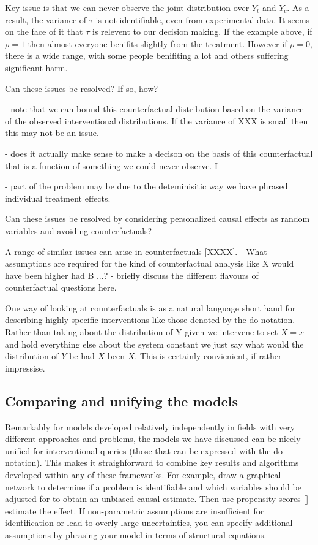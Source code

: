 \documentclass[11pt,a4paper,oneside]{book}
\begin{document}
Key issue is that we can never observe the joint distribution over $Y_t$ and $Y_c$. As a result, the variance of $\tau$ is not identifiable, even from experimental data. It seems on the face of it that $\tau$ is relevent to our decision making. If the example above, if $\rho = 1$ then almost everyone benifits slightly from the treatment. However if $\rho=0$, there is a wide range, with some people benifiting a lot and others suffering significant harm.  

Can these issues be resolved? If so, how? 

- note that we can bound this counterfactual distribution based on the variance of the observed interventional distributions. If the variance of XXX is small then this may not be an issue. 

- does it actually make sense to make a decison on the basis of this counterfactual that is a function of something we could never observe. I

- part of the problem may be due to the deteminisitic way we have phrased individual treatment effects. 

Can these issues be resolved by considering personalized causal effects as random variables and avoiding counterfactuals?

A range of similar issues can arise in counterfactuals \ref{XXXX}. 
- What assumptions are required for the kind of counterfactual analysis like X would have been higher had B ...?
- briefly discuss the different flavours of counterfactual questions here. 

One way of looking at counterfactuals is as a natural language short hand for describing highly specific interventions like those denoted by the do-notation. Rather than taking about the distribution of Y given we intervene to set $X=x$ and hold everything else about the system constant we just say what would the distribution of $Y$ be had $X$ been $X$. This is certainly convienient, if rather impressise. 


\subsection*{Comparing and unifying the models}

Remarkably for models developed relatively independently in fields with very different approaches and problems, the models we have discussed can be nicely unified for interventional queries (those that can be expressed with the do-notation). This makes it straighforward to combine key results and algorithms developed within any of these frameworks. For example, draw a graphical network to determine if a problem is identifiable and which variables should be adjusted for to obtain an unbiased causal estimate. Then use propensity scores \ref{} estimate the effect. If non-parametric assumptions are insufficient for identification or lead to overly large uncertainties, you can specify additional assumptions by phrasing your model in terms of structural equations. 
\end{document}
